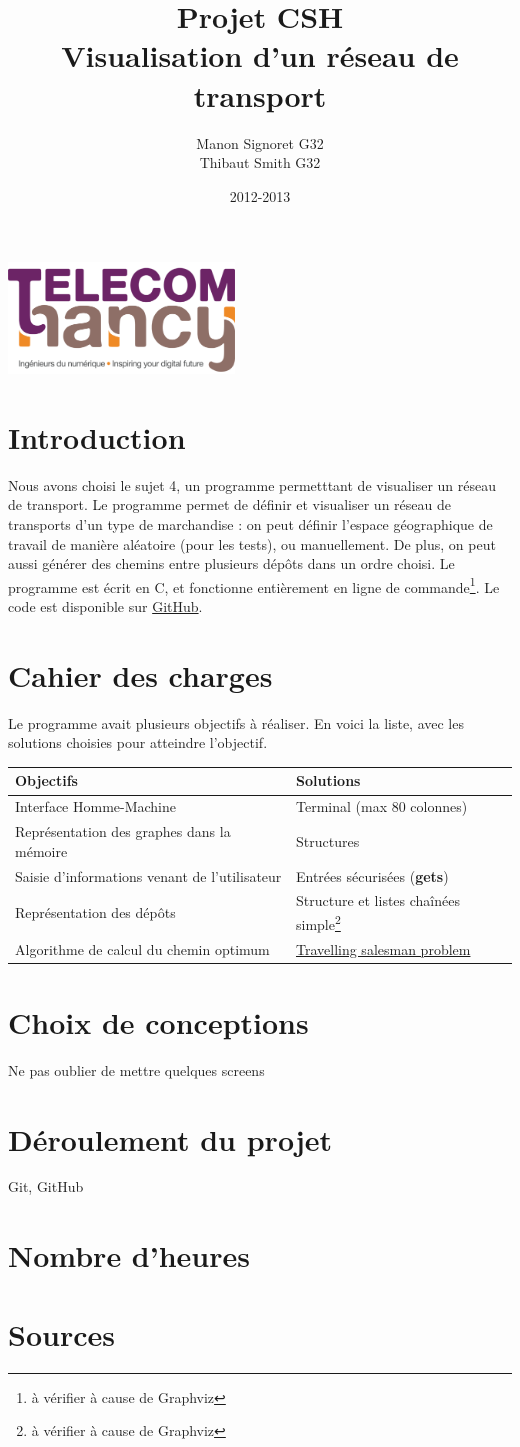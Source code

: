 \documentclass[12pt,a4paper]{report}
\date{2012-2013}
\author{Manon Signoret G32\\Thibaut Smith G32}
\title{Projet CSH\\Visualisation d'un réseau de transport}
\makeatletter
\def\maketitle{%
  \null
  \begin{flushleft}
   \includegraphics[width=6cm]{telecom_nancy.png} %
  \end{flushleft}
  \vfill
  \begin{center}\leavevmode
    \normalfont
    {\LARGE \@title\par}%
    {\Large \@date\par} 
    \vskip 1cm
  \end{center}%
  \vfill
  \hfill
  \begin{flushright}
    {\Large \@author\par}
  \end{flushright}
  \cleardoublepage
  }
\makeatother
\begin{document}
\thispagestyle{empty}
\maketitle
\pagebreak

\section{Introduction}
Nous avons choisi le sujet 4, un programme permetttant de visualiser un réseau de transport. Le programme permet de définir et visualiser un réseau de transports d'un type de marchandise : on peut définir l'espace géographique de travail de manière aléatoire (pour les tests), ou manuellement. De plus, on peut aussi générer des chemins entre plusieurs dépôts dans un ordre choisi. Le programme est écrit en C, et fonctionne entièrement en ligne de commande\footnote{à vérifier à cause de Graphviz}. Le code est disponible sur \href{https://github.com/Videl/Graph-Visualization-Manager}{GitHub}.


\section{Cahier des charges}

Le programme avait plusieurs objectifs à réaliser. En voici la liste, avec les solutions choisies pour atteindre l'objectif.

\begin{center}
\begin{tabular}{|m{7cm}|m{7cm}|}
  \hline
  Objectifs & Solutions \\
  \hline
  Interface Homme-Machine & Terminal (max 80 colonnes) \\
  \hline
  Représentation des graphes dans la mémoire & Structures\\
  \hline
  Saisie d'informations venant de l'utilisateur & Entrées sécurisées (\textbf{gets}) \\
  \hline
  Représentation des dépôts & Structure et listes chaînées simple\footnote{à vérifier à cause de Graphviz} \\
  \hline
  Algorithme de calcul du chemin optimum & \href{https://en.wikipedia.org/wiki/Travelling_salesman_problem}{Travelling salesman problem} \\
   
  \hline
\end{tabular}
\end{center}

\section{Choix de conceptions}
Ne pas oublier de mettre quelques screens
\section{Déroulement du projet}
Git, GitHub
\section{Nombre d'heures}
\section{Sources}
\end{document}
